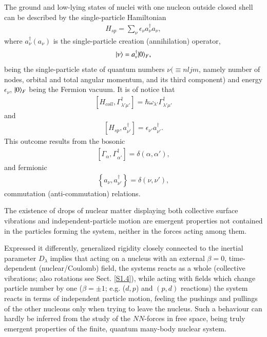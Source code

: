 The ground and low-lying states of nuclei with one nucleon outside closed shell can be described by the single-particle Hamiltonian
\begin{align}\label{eq1.0.10}
H_{sp}=\sum_{\nu}\epsilon_\nu a_\nu^\dagger a_\nu,
\end{align}
where $a_\nu^\dagger (a_\nu)$ is the single-particle creation (annihilation) operator,
\begin{align}\label{eq1.0.11}
|{\nu} \rangle=a_\nu^\dagger|{0} \rangle_F,
\end{align}
being the single-particle state of quantum numbers $\nu(\equiv nljm$, namely number of nodes, orbital and total angular momentum, and its third component) and energy $\epsilon_\nu$,  $|{0} \rangle_F$ being the Fermion vacuum. 
It is of notice that
\begin{align}\label{eq0.1.14}
\left[H_{coll},\Gamma^\dagger_{\lambda'\mu'}\right]=\hbar\omega_{\lambda'}\Gamma^\dagger_{\lambda'\mu'}
\end{align}
and 
\begin{align}\label{eq0.1.15}
\left[H_{sp},a^\dagger_{\nu'}\right]=\epsilon_{\nu'}a^\dagger_{\nu'}.
\end{align}
	This  outcome results from the bosonic
\begin{align}\label{eq0.1.16}
\left[\Gamma_{\alpha},\Gamma^\dagger_{\alpha'}\right]=\delta(\alpha,\alpha'),
\end{align}
	and fermionic
\begin{align}
\left\{a_\nu,a^\dagger_{\nu'}\right\}=\delta(\nu,\nu'),
\end{align}
commutation (anti-commutation) relations.


 The existence of drops of nuclear matter displaying both collective surface vibrations and independent-particle motion  are emergent properties not contained in the particles forming the system, neither in the forces acting among them. 


Expressed it differently, generalized rigidity closely connected to the inertial parameter $D_\lambda$ implies that acting on a nucleus with an external $\beta=0$, time-dependent (nuclear/Coulomb) field, the systems reacts as a whole (collective vibrations; also rotations see Sect. \ref{S1.4}), while acting with fields which change particle number by one ($\beta=\pm1$; e.g. ($d,p$) and $(p,d)$ reactions) the system reacts in terms of independent particle motion, feeling the pushings and pullings of the other nucleons only when trying to leave the nucleus. Such a behaviour can hardly be inferred from the study of the $NN$-forces in free space, being truly emergent properties of the finite, quantum many-body nuclear system.


